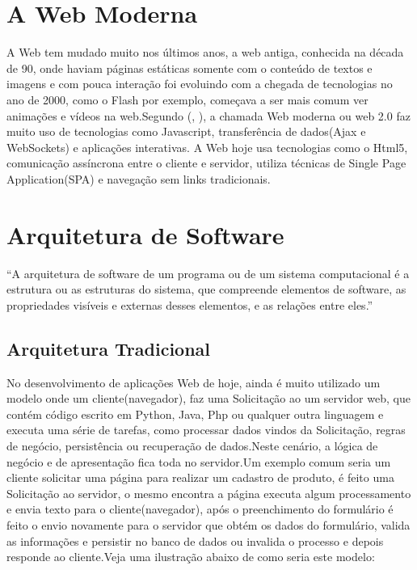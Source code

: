 \section{A Web Moderna}\label{sec:web-moderna}

A Web tem mudado muito nos últimos anos, a web antiga, conhecida na década de 90, onde haviam páginas estáticas somente com o conteúdo de textos e imagens e com pouca interação foi evoluindo com a chegada de tecnologias no ano de 2000, como o Flash por exemplo, começava a ser mais comum ver animações e vídeos na web.Segundo (, \citeyear{Marcondes}), a chamada Web moderna ou web 2.0 faz muito uso de tecnologias como Javascript, transferência de dados(Ajax e WebSockets) e aplicações interativas. A Web hoje usa tecnologias como o Html5, comunicação assíncrona entre o cliente e servidor, utiliza técnicas de Single Page Application(SPA) e navegação sem links tradicionais.


\section{Arquitetura de Software}\label{sec:arquitetura}
“A arquitetura de software de um programa ou de um sistema computacional é a estrutura ou as estruturas do sistema, que compreende elementos de software, as propriedades visíveis e externas desses elementos, e as relações entre eles.”\cite{BASS}

\subsection{Arquitetura Tradicional}

No desenvolvimento de aplicações Web de hoje, ainda é muito utilizado um modelo onde um cliente(navegador), faz uma Solicitação  ao um servidor web, que contém código escrito em Python, Java, Php ou qualquer outra linguagem e executa uma série de tarefas, como processar dados vindos da Solicitação, regras de negócio, persistência ou recuperação de dados.Neste cenário, a lógica de negócio e de apresentação fica toda no servidor.Um exemplo comum seria um cliente solicitar uma página para realizar um cadastro de produto, é feito uma Solicitação ao servidor, o mesmo encontra a página executa algum processamento e envia texto para o cliente(navegador), após o preenchimento do formulário é feito o envio novamente para o servidor que obtém os dados do formulário, valida as informações e persistir no banco de dados ou invalida o processo e depois responde ao cliente.Veja uma ilustração abaixo de como seria este modelo:


